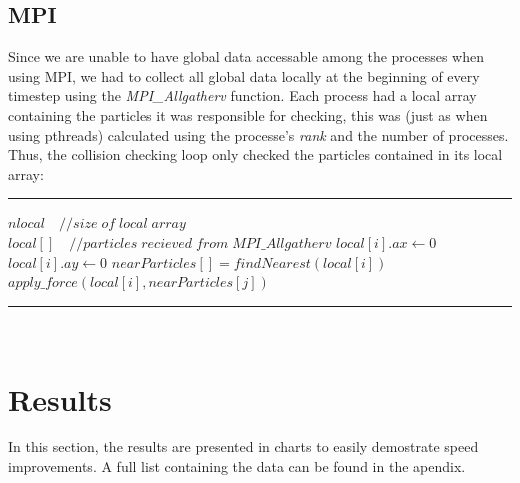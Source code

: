 \documentclass[11pt,a4paper]{article}
\begin{document}
\subsection{MPI}
Since we are unable to have global data accessable among the processes when using MPI, we had to collect all global data locally at the beginning of every timestep using the \emph{MPI\_Allgatherv} function. Each process had a local array containing the particles it was responsible for checking, this was (just as when using pthreads) calculated using the processe's \emph{rank} and the number of processes. Thus, the collision checking loop only checked the particles contained in its local array:
\\
\rule{125mm}{0.1pt}
\begin{algorithmic}
\STATE $nlocal\quad //size\;of\;local\;array$
\STATE $local[]\quad //particles\;recieved\;from\;MPI\_Allgatherv$
	\STATE $local[i].ax \gets 0$
	\STATE $local[i].ay \gets 0$
	\STATE $nearParticles[] = findNearest(local[i])$
			\STATE $apply\_force(local[i],nearParticles[j])$
	\ENDFOR
\ENDFOR 
\end{algorithmic}
\rule{125mm}{0.1pt}
\vspace{10pt}
\\
\newpage
\section{Results}
In this section, the results are presented in charts to easily demostrate speed improvements. A full list containing the data can be found in the apendix.
\end{document}
